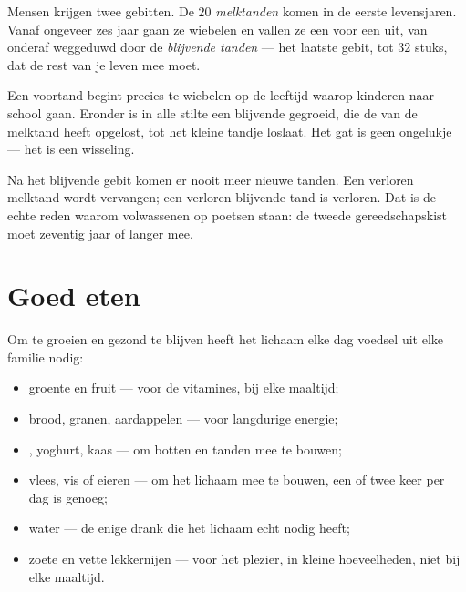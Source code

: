 \begin{proposition}\label{prop:g2:teeth-and-eating-well:sets}
Mensen krijgen twee gebitten. De $20$ \emph{melktanden}
komen in de eerste levensjaren. Vanaf ongeveer zes jaar gaan ze wiebelen
en vallen ze een voor een uit, van onderaf weggeduwd door de
\emph{blijvende tanden} --- het laatste gebit,
tot $32$ stuks, dat de rest van je leven mee moet.
\end{proposition}
\admitted

\begin{example}\label{ex:g2:teeth-and-eating-well:wobbly}
Een voortand begint precies te wiebelen op de leeftijd waarop kinderen
naar school gaan. Eronder is in alle stilte een blijvende 
gegroeid, die de  van de melktand heeft opgelost, tot het kleine
tandje loslaat. Het gat is geen ongelukje --- het is een wisseling.
\end{example}

\begin{remark}\label{rem:g2:teeth-and-eating-well:nothird}
Na het blijvende gebit komen er nooit meer nieuwe tanden. Een verloren
melktand wordt vervangen; een verloren blijvende tand is verloren. Dat
is de echte reden waarom volwassenen op poetsen staan: de tweede
gereedschapskist moet zeventig jaar of langer mee.
\end{remark}

\section{Goed eten}

\begin{proposition}\label{prop:g2:teeth-and-eating-well:balanced}
Om te groeien en gezond te blijven heeft het lichaam elke dag voedsel
uit elke familie nodig:
\begin{itemize}
  \item groente en fruit --- voor de vitamines, bij elke maaltijd;
  \item brood, granen, aardappelen --- voor langdurige energie;
  \item {}, yoghurt, kaas --- om botten en tanden mee te bouwen;
  \item vlees, vis of eieren --- om het lichaam mee te bouwen, een of
        twee keer per dag is genoeg;
  \item water --- de enige drank die het lichaam echt nodig heeft;
  \item zoete en vette lekkernijen --- voor het plezier, in kleine
        hoeveelheden, niet bij elke maaltijd.
\end{itemize}
\end{proposition}
\admitted

